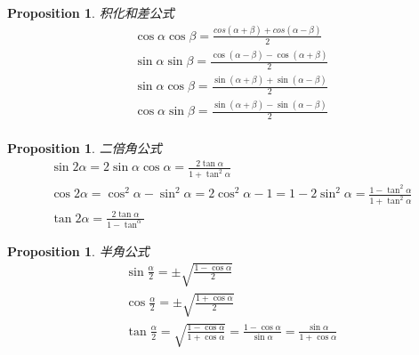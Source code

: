 \documentclass{article}
\newtheorem{proposition}[theorem]{Proposition}
\begin{document}
\begin{proposition}
\rm 积化和差公式
$$
\begin{array}{ll}
\cos\alpha \cos\beta = \frac{cos(\alpha+\beta)+cos(\alpha-\beta)}{2} \\
\sin\alpha \sin\beta = \frac{\cos(\alpha-\beta)-\cos(\alpha+\beta)}{2} \\ 
\sin\alpha \cos\beta = \frac{\sin(\alpha+\beta)+\sin(\alpha-\beta)}{2} \\
\cos\alpha \sin\beta = \frac{\sin(\alpha+\beta)-\sin(\alpha-\beta)}{2} \\ 
\end{array}
$$
\end{proposition}

\begin{proposition}
\rm 二倍角公式
$$
\begin{array}{ll}
\sin 2\alpha = 2\sin \alpha \cos \alpha = \frac{2\tan \alpha}{1 + \tan^2 \alpha}\\
\cos 2\alpha = \cos^2 \alpha - \sin^2 \alpha =  2\cos^2\alpha - 1 = 1 - 2\sin^2 \alpha  = \frac{1-\tan^2 \alpha}{1 + \tan^2\alpha}\\
\tan 2\alpha = \frac{2\tan\alpha}{1-\tan^\alpha}
\end{array}
$$
\end{proposition}

\begin{proposition}
\rm 半角公式
$$
\begin{array}{ll}
\sin\frac{\alpha}{2} = \pm \sqrt{\frac{1-\cos \alpha}{2}} \\
\cos\frac{\alpha}{2} = \pm \sqrt{\frac{1+\cos \alpha}{2}} \\
\tan\frac{\alpha}{2} = \sqrt{\frac{1-\cos \alpha}{1+\cos \alpha}} = \frac{1-\cos \alpha}{\sin \alpha} = \frac{\sin \alpha}{1+\cos \alpha}\\
\end{array}
$$
\end{proposition}
\end{document}
